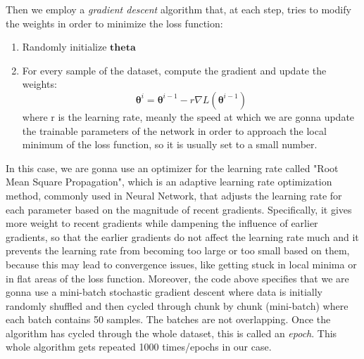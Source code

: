 \documentclass[12pt,twoside]{article}
\begin{document}
\begin{enumerate}
\begin{enumerate}
	Then we employ a \textit{gradient descent }algorithm that, at each step, tries to modify the weights in order to minimize the loss function:
	\begin{enumerate}
		\item Randomly initialize $\mathbf{theta}$
		\item For every sample of the dataset, compute the gradient and update the weights:
		\begin{equation}
			\boldsymbol{\theta}^i=\boldsymbol{\theta}^{i-1}-r \nabla L\left(\boldsymbol{\theta}^{i-1}\right)
		\end{equation}
		where r is the learning rate, meanly the speed at which we are gonna update the trainable parameters of the network in order to approach the local minimum of the loss function, so it is usually set to a small number.
	\end{enumerate}
	In this case, we are gonna use an optimizer for the learning rate called "Root Mean Square Propagation", which is an adaptive learning rate optimization method, commonly used in Neural Network, that adjusts the learning rate for each parameter based on the magnitude of recent gradients. Specifically, it gives more weight to recent gradients while dampening the influence of earlier gradients, so that the earlier gradients do not affect the learning rate much and it prevents the learning rate from becoming too large or too small based on them, because this may lead to convergence issues, like getting stuck in local minima or in flat areas of the loss function.
	Moreover, the code above specifies that we are gonna use a mini-batch stochastic gradient descent where data is initially randomly shuffled and then cycled through chunk by chunk (mini-batch) where each batch contains 50 samples. The batches are not overlapping. Once the algorithm has cycled through the whole dataset, this is called an \textit{epoch}.
	This whole algorithm gets repeated 1000 times/epochs in our case.


\end{enumerate}
\end{enumerate}
\end{document}
